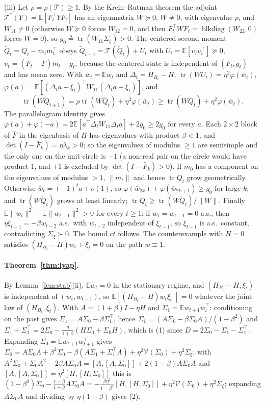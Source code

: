 \documentclass[11pt]{article}
\theoremstyle{remark}
\newcommand{\E}{\mathbb{E}}
\newcommand{\tr}{\operatorname{tr}}
\newcommand{\T}{\mathcal T}
\newcommand{\V}{\mathcal V}
\begin{document}
(iii) Let $\rho=\rho(\T)\ge1$. By the Krein--Rutman theorem \citep[Thm.~1.3.2]{berman1994} the adjoint $\T^*(Y)=\E[F_t^\top YF_t]$ has an eigenmatrix $W\succeq0$, $W\ne0$, with eigenvalue $\rho$, and $W_{11}\ne0$ (otherwise $W\succeq0$ forces $W_{12}=0$, and then $F_t^\top WF_t=\operatorname{blkdiag}(W_{22},0)$ forces $W=0$), so $g_0\triangleq\tr(W_{11}\Sigma_\xi)>0$. The centered second moment $\widetilde Q_t=Q_t-m_tm_t^\top$ obeys $\widetilde Q_{t+1}=\T(\widetilde Q_t)+U_t$ with $U_t=\E[\upsilon_t\upsilon_t^\top]\succeq0$, $\upsilon_t=(F_t-\bar F)m_t+g_t$, because the centered state is independent of $(F_t,g_t)$ and has mean zero. With $\bar w_t=\E w_t$ and $\Delta_t=H_{B_t}-H$, $\tr(WU_t)=\eta^2\varphi(\bar w_t)$, $\varphi(a)=\E[(\Delta_ta+\xi_t)^\top W_{11}(\Delta_ta+\xi_t)]$, and
\[
\tr(W\widetilde Q_{t+1})=\rho\tr(W\widetilde Q_t)+\eta^2\varphi(\bar w_t)\ge\tr(W\widetilde Q_t)+\eta^2\varphi(\bar w_t).
\]
The parallelogram identity gives $\varphi(a)+\varphi(-a)=2\E[a^\top\Delta_tW_{11}\Delta_ta]+2g_0\ge2g_0$ for every $a$. Each $2\times2$ block of $\bar F$ in the eigenbasis of $H$ has eigenvalues with product $\beta<1$, and $\det(I-\bar F_k)=\eta\lambda_k>0$; so the eigenvalues of modulus $\ge1$ are semisimple and the only one on the unit circle is $-1$ (a non-real pair on the circle would have product $1$, and $+1$ is excluded by $\det(I-\bar F_k)>0$). If $m_0$ has a component on the eigenvalues of modulus $>1$, $\|m_t\|$ and hence $\tr Q_t$ grow geometrically. Otherwise $\bar w_t=(-1)^ta+o(1)$, so $\varphi(\bar w_{2k})+\varphi(\bar w_{2k+1})\ge g_0$ for large $k$, and $\tr(W\widetilde Q_t)$ grows at least linearly; $\tr Q_t\ge\tr(W\widetilde Q_t)/\|W\|$. Finally $\E\|w_t\|^2+\E\|w_{t-1}\|^2>0$ for every $t\ge1$: if $w_t=w_{t-1}=0$ a.s., then $\eta\xi_{t-1}=-\beta w_{t-2}$ a.s.\ with $w_{t-2}$ independent of $\xi_{t-1}$, so $\xi_{t-1}$ is a.s.\ constant, contradicting $\Sigma_\xi\succ0$. The bound $ct$ follows. The counterexample with $H=0$ satisfies $(H_{B_t}-H)w_t+\xi_t=0$ on the path $w\equiv1$.

\paragraph{Theorem~\ref{thm:lyap}.}
By Lemma~\ref{lem:stab}(ii), $\E w_t=0$ in the stationary regime, and $(H_{B_t}-H,\xi_t)$ is independent of $(w_t,w_{t-1})$, so $\E[(H_{B_t}-H)w_t\xi_t^\top]=0$ whatever the joint law of $(H_{B_t},\xi_t)$. With $A=(1+\beta)I-\eta H$ and $\Sigma_1=\E w_{t+1}w_t^\top$: conditioning on the past gives $\Sigma_1=A\Sigma_0-\beta\Sigma_1^\top$, hence $\Sigma_1=(A\Sigma_0-\beta\Sigma_0A)/(1-\beta^2)$ and $\Sigma_1+\Sigma_1^\top=2\Sigma_0-\frac{\eta}{1+\beta}(H\Sigma_0+\Sigma_0H)$, which is (1) since $D=2\Sigma_0-\Sigma_1-\Sigma_1^\top$. Expanding $\Sigma_0=\E w_{t+1}w_{t+1}^\top$ gives $\Sigma_0=A\Sigma_0A+\beta^2\Sigma_0-\beta(A\Sigma_1+\Sigma_1^\top A)+\eta^2\V(\Sigma_0)+\eta^2\Sigma_\xi$; with $A^2\Sigma_0+\Sigma_0A^2-2\beta A\Sigma_0A=[A,[A,\Sigma_0]]+2(1-\beta)A\Sigma_0A$ and $[A,[A,\Sigma_0]]=\eta^2[H,[H,\Sigma_0]]$ this is $(1-\beta^2)\Sigma_0-\frac{1-\beta}{1+\beta}A\Sigma_0A=-\frac{\beta\eta^2}{1-\beta^2}[H,[H,\Sigma_0]]+\eta^2\V(\Sigma_0)+\eta^2\Sigma_\xi$; expanding $A\Sigma_0A$ and dividing by $\eta(1-\beta)$ gives (2).
\end{document}
